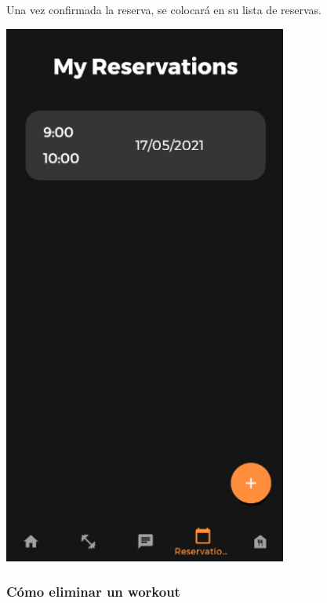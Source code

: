 \documentclass[12pt,a4paper]{article}
\begin{document}
\begin{enumerate}
\begin{minipage}{.60\textwidth}
  \item Una vez confirmada la reserva, se colocará en su lista de reservas.
\end{minipage}
\begin{minipage}{.40\textwidth}
  \includegraphics[width=0.7\textwidth, right]{misreservas}
\end{minipage}

\end{enumerate}


\subsubsection{Cómo eliminar un workout}
\end{document}

